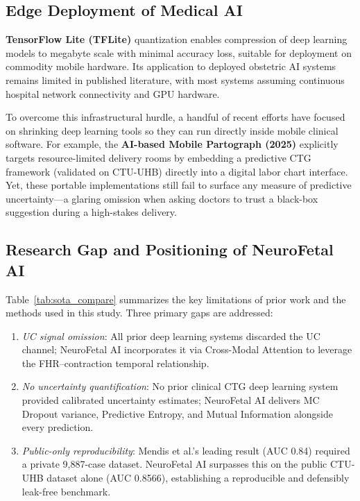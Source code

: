 \documentclass[conference]{IEEEtran}
\begin{document}
\subsection{Edge Deployment of Medical AI}

\textbf{TensorFlow Lite (TFLite)} quantization enables compression of deep
learning models to megabyte scale with minimal accuracy loss, suitable for
deployment on commodity mobile hardware. Its application to deployed
obstetric AI systems remains limited in published literature, with most
systems assuming continuous hospital network connectivity and GPU hardware.

To overcome this infrastructural hurdle, a handful of recent efforts have focused on shrinking deep learning tools so they can run directly inside mobile clinical software. For example, the
\textbf{AI-based Mobile Partograph (2025)} \cite{eajhs2025} explicitly targets
resource-limited delivery rooms by embedding a predictive CTG framework
(validated on CTU-UHB) directly into a digital labor chart interface. Yet, these portable implementations still fail to surface any measure of predictive uncertainty—a glaring omission when asking doctors to trust a black-box suggestion during a high-stakes delivery.

\subsection{Research Gap and Positioning of NeuroFetal AI}

Table~\ref{tab:sota_compare} summarizes the key limitations of prior work and
the methods used in this study. Three primary gaps are addressed:

\begin{enumerate}
    \item \textit{UC signal omission}: All prior deep learning systems
    discarded the UC channel; NeuroFetal AI incorporates it via Cross-Modal
    Attention to leverage the FHR–contraction temporal relationship.
    \item \textit{No uncertainty quantification}: No prior clinical CTG
    deep learning system provided calibrated uncertainty estimates; NeuroFetal
    AI delivers MC Dropout variance, Predictive Entropy, and Mutual
    Information alongside every prediction.
    \item \textit{Public-only reproducibility}: Mendis et al.'s leading result
    (AUC 0.84) required a private 9,887-case dataset. NeuroFetal AI surpasses
    this on the public CTU-UHB dataset alone (AUC 0.8566), establishing a
    reproducible and defensibly leak-free benchmark.
\end{enumerate}
\end{document}
